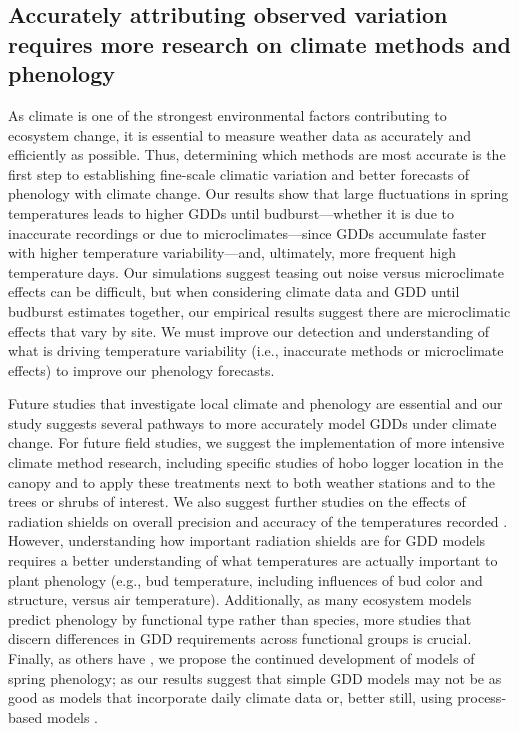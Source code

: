 \documentclass{article}\usepackage[]{graphicx}\usepackage[]{color}
\begin{document}
\subsection*{Accurately attributing observed variation requires more research on climate methods and phenology} 
As climate is one of the strongest environmental factors contributing to ecosystem change, it is essential to measure weather data as accurately and efficiently as possible. Thus, determining which methods are most accurate is the first step to establishing fine-scale climatic variation and better forecasts of phenology with climate change. Our results show that large fluctuations in spring temperatures leads to higher GDDs until budburst---whether it is due to inaccurate recordings or due to microclimates---since GDDs accumulate faster with higher temperature variability---and, ultimately, more frequent high temperature days. Our simulations suggest teasing out noise versus microclimate effects can be difficult, but when considering climate data and GDD until budburst estimates together, our empirical results suggest there are microclimatic effects that vary by site. We must improve our detection and understanding of what is driving temperature variability (i.e., inaccurate methods or microclimate effects) to improve our phenology forecasts.
  
Future studies that investigate local climate and phenology are essential and our study suggests several pathways to more accurately model GDDs under climate change. For future field studies, we suggest the implementation of more intensive climate method research, including specific studies of hobo logger location in the canopy and to apply these treatments next to both weather stations and to the trees or shrubs of interest. We also suggest further studies on the effects of radiation shields on overall precision and accuracy of the temperatures recorded \citep{daCunha2015}. However, understanding how important radiation shields are for GDD models requires a better understanding of what temperatures are actually important to plant phenology (e.g., bud temperature, including influences of bud color and structure, versus air temperature). Additionally, as many ecosystem models predict phenology by functional type rather than species, more studies that discern differences in GDD requirements across functional groups is crucial. Finally, as others have \citep{Duputie2015,Chuine2016}, we propose the continued development of models of spring phenology; as our results suggest that simple GDD models may not be as good as models that incorporate daily climate data or, better still, using process-based models \citep{Keenan2019}. 
 
\end{document}
